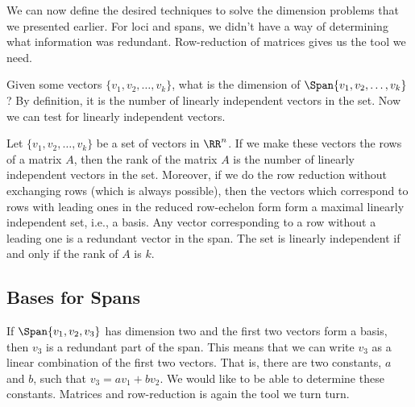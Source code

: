 \documentclass[fleqn]{report}
\begin{document}
We can now define the desired techniques to solve the
dimension problems that we presented earlier. For loci and
spans, we didn't have a way of determining what information
was redundant. Row-reduction of matrices gives us the tool we
need. 

Given some vectors $\{v_1, v_2, \ldots, v_k\}$, what is the dimension
of $\Span \{ v_1, v_2, \ldots, v_k\}$? By definition, it is the
number of linearly independent vectors in the set. Now we can
test for linearly independent vectors.

\begin{prop}
Let $\{v_1, v_2, \ldots, v_k\}$ be a set of vectors in $\RR^n$.
If we make these vectors the rows of a matrix $A$, then the rank
of the matrix $A$ is the number of linearly independent vectors
in the set. Moreover, if we do the row reduction without
exchanging rows (which is always possible), then the vectors
which correspond to rows with leading ones in the reduced
row-echelon form form a maximal linearly independent set,
i.e., a basis. Any
vector corresponding to a row without a leading one is a
redundant vector in the span. The set is linearly independent
if and only if the rank of $A$ is $k$.
\end{prop}

\subsection{Bases for Spans}
\label{bases-for-spans}

If $\Span\{v_1, v_2, v_3\}$ has dimension two and the first
two vectors form a basis, then $v_3$ is a redundant part of
the span. This means that we can write $v_3$ as a linear
combination of the first two vectors. That is, there are two
constants, $a$ and $b$, such that $v_3 = av_1 + bv_2$. We
would like to be able to determine these constants. Matrices
and row-reduction is again the tool we turn turn.
\end{document}
